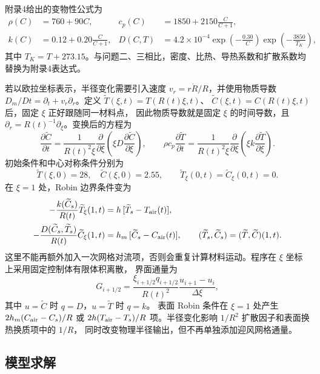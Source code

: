 \documentclass[withoutpreface,bwprint]{cumcm_thesis}
\begin{document}
附录4给出的变物性公式为
\begin{align}
 \rho(C)&=760+90C, & c_p(C)&=1850+2150\frac{C}{C+1},\\
 k(C)&=0.12+0.20\frac{C}{C+1}, &
 D(C,T)&=4.2\times10^{-4}\exp\left(-\frac{0.30}{C}\right)
 \exp\left(-\frac{3850}{T_K}\right),
\end{align}
其中 \(T_K=T+273.15\)。与问题二、三相比，密度、比热、导热系数和扩散系数均替换为附录4表达式。

若以欧拉坐标表示，半径变化需要引入速度
\(v_r=r\dot R/R\)，并使用物质导数
\(D_m/Dt=\partial_t+v_r\partial_r\)。定义
\(\widetilde T(\xi,t)=T(R(t)\xi,t)\)、
\(\widetilde C(\xi,t)=C(R(t)\xi,t)\) 后，固定 \(\xi\) 正好跟随同一材料点，
因此物质导数就是固定 \(\xi\) 的时间导数，且
\(\partial_r=R(t)^{-1}\partial_\xi\)。变换后的方程为
\begin{equation}
 \frac{\partial \widetilde C}{\partial t}
 =\frac{1}{R(t)^2\xi}\frac{\partial}{\partial\xi}
 \left(\xi D\frac{\partial \widetilde C}{\partial\xi}\right),
 \qquad
 \rho c_p\frac{\partial \widetilde T}{\partial t}
 =\frac{1}{R(t)^2\xi}\frac{\partial}{\partial\xi}
 \left(\xi k\frac{\partial \widetilde T}{\partial\xi}\right).
\end{equation}
初始条件和中心对称条件分别为
\begin{equation}
 \widetilde T(\xi,0)=28,\quad \widetilde C(\xi,0)=2.55,
 \qquad \widetilde T_\xi(0,t)=\widetilde C_\xi(0,t)=0 .
\end{equation}
在 \(\xi=1\) 处，Robin 边界条件变为
\begin{align}
 -\frac{k(\widetilde C_s)}{R(t)}\widetilde T_\xi(1,t)
   &=h\,[\widetilde T_s-T_{\rm air}(t)],\\
 -\frac{D(\widetilde C_s,\widetilde T_s)}{R(t)}\widetilde C_\xi(1,t)
   &=h_m\,[\widetilde C_s-C_{\rm air}(t)],
 \qquad (\widetilde T_s,\widetilde C_s)=(\widetilde T,\widetilde C)(1,t).
\end{align}
这里不能再额外加入一次网格对流项，否则会重复计算材料运动。程序在 \(\xi\) 坐标上采用固定控制体有限体积离散，
界面通量为
\begin{equation}
 G_{i+1/2}=\frac{\xi_{i+1/2}q_{i+1/2}}{R(t)^2}
 \frac{u_{i+1}-u_i}{\Delta\xi},
\end{equation}
其中 \(u=\widetilde C\) 时 \(q=D\)，\(u=\widetilde T\) 时 \(q=k\)。
表面 Robin 条件在 \(\xi=1\) 处产生 \(2h_m(C_{\rm air}-C_s)/R\) 或
\(2h(T_{\rm air}-T_s)/R\) 项。半径变化影响 \(1/R^2\) 扩散因子和表面换热换质项中的 \(1/R\)，
同时改变物理半径输出，但不再单独添加迎风网格通量。

\subsection{模型求解}
\end{document}
